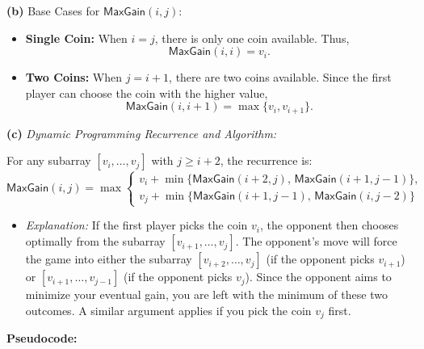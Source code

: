 \documentclass[11pt]{article}
\begin{document}
        \textbf{(b)} Base Cases for \(\mathsf{MaxGain}(i,j)\):
        \begin{itemize}
            \item \textbf{Single Coin:} When \(i = j\), there is only one coin available. Thus,
            \[
            \mathsf{MaxGain}(i,i) = v_i.
            \]
            \item \textbf{Two Coins:} When \(j = i+1\), there are two coins available. Since the first player can choose the coin with the higher value,
            \[
            \mathsf{MaxGain}(i,i+1) = \max\{v_i, v_{i+1}\}.
            \]
        \end{itemize}
        
        \bigskip
        
        \textbf{(c)} \emph{Dynamic Programming Recurrence and Algorithm:}
        
        For any subarray \([v_i, \dots, v_j]\) with \(j \ge i+2\), the recurrence is:
        \[
        \mathsf{MaxGain}(i,j) = \max\left\{
        \begin{array}{l}
        v_i + \min\{\mathsf{MaxGain}(i+2,j),\, \mathsf{MaxGain}(i+1,j-1)\},\\[1mm]
        v_j + \min\{\mathsf{MaxGain}(i+1,j-1),\, \mathsf{MaxGain}(i,j-2)\}
        \end{array}
        \right.
        \]
        \begin{itemize}
            \item \emph{Explanation:}  
            If the first player picks the coin \(v_i\), the opponent then chooses optimally from the subarray \([v_{i+1}, \dots, v_j]\). The opponent’s move will force the game into either the subarray \([v_{i+2}, \dots, v_j]\) (if the opponent picks \(v_{i+1}\)) or \([v_{i+1}, \dots, v_{j-1}]\) (if the opponent picks \(v_j\)). Since the opponent aims to minimize your eventual gain, you are left with the minimum of these two outcomes. A similar argument applies if you pick the coin \(v_j\) first.
        \end{itemize}
        
        \textbf{Pseudocode:}
        
\end{document}
